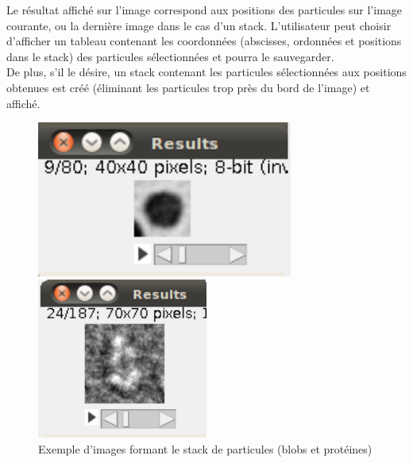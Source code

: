 Le résultat affiché sur l'image correspond aux positions des particules sur l'image courante, ou la dernière image dans le cas d'un stack.
L'utilisateur peut choisir d'afficher un tableau contenant les coordonnées (abscisses, ordonnées et positions dans le stack) des particules sélectionnées et pourra le sauvegarder. \\

De plus, s'il le désire, un stack contenant les particules sélectionnées aux positions obtenues est créé (éliminant les particules trop près du bord de l'image) et affiché.

\begin{figure}[!ht]
\begin{center}
 \begin{minipage}{.450\linewidth}
  \includegraphics[width=0.75\textwidth]{cropblob.png}  
 \end{minipage} \hfill
\begin{minipage}{.450\linewidth}
  \includegraphics[width=0.5\textwidth]{cropprotDog.png}   
 \end{minipage} \hfill
\caption{Exemple d'images formant le stack de particules (blobs et protéines)}
\end{center}
\end{figure}

